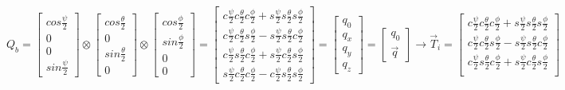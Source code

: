 \begin{subequations}
\begin{equation}
Q_b=\begin{bmatrix}
cos\frac{\psi}{2}\\
0\\
0\\
sin\frac{\psi}{2}
\end{bmatrix}
\otimes
\begin{bmatrix}
cos\frac{\theta}{2}\\
0\\
sin\frac{\theta}{2}\\
0
\end{bmatrix}
\otimes
\begin{bmatrix}
cos\frac{\phi}{2}\\
sin\frac{\phi}{2}\\
0\\
0
\end{bmatrix}
\end{equation}
\begin{equation}
=
\begin{bmatrix}
c\frac{\psi}{2}c\frac{\theta}{2}c\frac{\phi}{2}+s\frac{\psi}{2}s\frac{\theta}{2}s\frac{\phi}{2}\\
c\frac{\psi}{2}c\frac{\theta}{2}s\frac{\phi}{2}-s\frac{\psi}{2}s\frac{\theta}{2}c\frac{\phi}{2}\\
c\frac{\psi}{2}s\frac{\theta}{2}c\frac{\phi}{2}+s\frac{\psi}{2}c\frac{\theta}{2}s\frac{\phi}{2}\\
s\frac{\psi}{2}c\frac{\theta}{2}c\frac{\phi}{2}-c\frac{\psi}{2}s\frac{\theta}{2}s\frac{\phi}{2}
\end{bmatrix}
=
\begin{bmatrix}
q_0\\
q_x\\
q_y\\
q_z
\end{bmatrix}
=
\begin{bmatrix}
q_0\\
\vec{q}
\end{bmatrix}
\end{equation}
\begin{equation}
\rightarrow\vec{T}_i=
\begin{bmatrix}
c\frac{\psi}{2}c\frac{\theta}{2}c\frac{\phi}{2}+s\frac{\psi}{2}s\frac{\theta}{2}s\frac{\phi}{2}\\
c\frac{\psi}{2}c\frac{\theta}{2}s\frac{\phi}{2}-s\frac{\psi}{2}s\frac{\theta}{2}c\frac{\phi}{2}\\
c\frac{\psi}{2}s\frac{\theta}{2}c\frac{\phi}{2}+s\frac{\psi}{2}c\frac{\theta}{2}s\frac{\phi}{2}\\

\end{bmatrix}
\end{equation}
\end{subequations}
